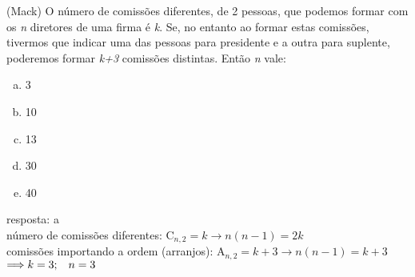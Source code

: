 \begin{ex}
(Mack) O número de comissões diferentes, de 2 pessoas, que podemos formar com os \textit{n} diretores de uma firma é \textit{k}. Se, no entanto ao formar estas comissões, tivermos que indicar uma das pessoas para presidente e a outra para suplente, poderemos formar \textit{k+3} comissões distintas. Então \textit{n} vale:
   \begin{enumerate}[(a)]
   \item 3
   \item 10
   \item 13
   \item 30
   \item 40
   \end{enumerate}
     \begin{sol}
       resposta: a \\
       número de comissões diferentes: $\mathrm{C}_{n,2}=k \longrightarrow n(n-1)=2k$ \\
       comissões importando a ordem (arranjos): $\mathrm{A}_{n,2}=k+3 \longrightarrow n(n-1)=k+3$ \\
       $ \Longrightarrow k=3 ;\hspace{0,3cm} n=3 $
     \end{sol}
\end{ex}